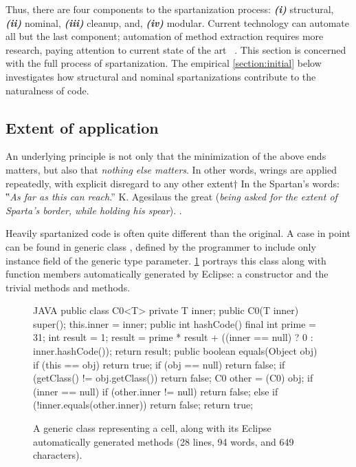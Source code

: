 Thus, there are four components to the spartanization process:
\emph{\textbf{(i)}} structural,
\emph{\textbf{(ii)}} nominal,
\emph{\textbf{(iii)}} cleanup, and,
\emph{\textbf{(iv)}} modular.
Current technology can automate all but the last component;
automation of method extraction requires more research,
paying attention to current state of the art \matteo~\cite{%
    we should have many citations
    somewhere can you please add some citations
}.
This section is concerned with the full process of spartanization.
The empirical \cref{section:initial} below investigates how structural and
nominal spartanizations contribute to the naturalness of code.

\subsection{Extent of application}
\label{section:extent}
An underlying principle is not only that the minimization of
the above ends matters, but also that \emph{nothing else matters}.
In other words, wrings are applied repeatedly, with explicit disregard
to any other extent†{%
  In the Spartan's words: ‟\textit{As far as this can reach}.” K. Agesilaus the
  great (\textsl{being asked for the extent of Sparta's border, while
  holding his spear}).
}.

Heavily spartanized code is often quite different than the original. A case in
point can be found in generic class , defined by the programmer to
include only instance field  of the generic type parameter.
\cref{figure:cell0} portrays this class along with function members
automatically generated by Eclipse: a constructor and the trivial methods
 and  methods.

\begin{figure}
  \caption{A generic class representing a cell, along with its Eclipse
  automatically generated methods (28 lines, 94 words, and 649 characters).}
    \label{figure:cell0}
    \begin{adjustbox}{max width=\columnwidth}
\begin{code}[minipage, width=1.25\columnwidth]{JAVA}
public class C0<T> {
  private T inner;
  public C0(T inner) {
    super();
    this.inner = inner;
  }
  public int hashCode() {
    final int prime = 31;
    int result = 1;
    result = prime * result + ((inner == null) ? 0 : inner.hashCode());
    return result;
  }
  public boolean equals(Object obj) {
    if (this == obj)
      return true;
    if (obj == null)
      return false;
    if (getClass() != obj.getClass())
      return false;
    C0 other = (C0) obj;
    if (inner == null) {
      if (other.inner != null)
        return false;
    } else if (!inner.equals(other.inner))
      return false;
    return true;
  }
}
\end{code}
\end{adjustbox}
\end{figure}

